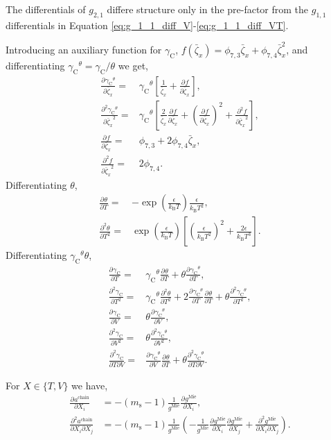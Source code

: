 \documentclass[english]{../thermomemo/thermomemo}
\newcommand*{\pd}[3][]{\frac{\partial^{#1}#2}{\partial{#3}^{#1}}}%
\newcommand*{\pdc}[3]{\frac{\partial^{2}#1}{\partial{#2}\partial{#3}}}%
\newcommand*{\lb}{\left(}
\newcommand*{\rb}{\right)}
\newcommand{\mie}{\text{Mie}\xspace}
\newcommand{\chain}{\ensuremath{\text{chain}}\xspace}
\newcommand{\seg}{\ensuremath{\text{s}}\xspace}
\newcommand{\kB}{\ensuremath{k_{\text{B}}}\xspace}
\newcommand{\gamc}{\ensuremath{\gamma_{\text{C}}}\xspace}
\newcommand{\zb}{\bar{\zeta}}
\begin{document}
The differentials of $g_{2,1}$ differe structure only in the
pre-factor from the $g_{1,1}$ differentials in Equation
\ref{eq:g_1_1_diff_V}-\ref{eq:g_1_1_diff_VT}.

Introducing an auxiliary function for $\gamc$,
$f\lb\zb_x \rb = \phi_{7,3}\zb_x + \phi_{7,4} \zb_x^2$, and differentiating $\gamc^\theta = \gamc/\theta$
we get,
\begin{align}
  \label{eq:gamma_theta_C_diff}
  \pd{\gamc^\theta}{\zb_x} =& \gamc^\theta \left[\frac{1}{\zb_x} + \pd{f}{\zb_x} \right], \\
  \pd[2]{\gamc^\theta}{\zb_x} =& \gamc^\theta \left[\frac{2}{\zb_x}\pd{f}{\zb_x} + \lb\pd{f}{\zb_x} \rb^2 + \pd[2]{f}{\zb_x}\right],\\
    \pd{f}{\zb_x} =& \phi_{7,3} + 2\phi_{7,4} \zb_x, \\
  \pd[2]{f}{\zb_x} =& 2\phi_{7,4}.
\end{align}
Differentiating $\theta$,
\begin{align}
  \label{eq:theta_diff}
  \pd{\theta}{T} =& - \exp\lb \frac{ \epsilon}{\kB T} \rb \frac{\epsilon}{\kB T^2}, \\
  \pd[2]{\theta}{T} =& \exp\lb \frac{ \epsilon}{\kB T} \rb \left[\lb\frac{\epsilon}{\kB T^2}\rb^2 + \frac{2\epsilon}{\kB T^3} \right].
\end{align}
Differentiating $\gamc^\theta \theta$,
\begin{align}
  \label{eq:gamma_C_diff_T}
  \pd{\gamc}{T} =& \gamc^\theta \pd{\theta}{T} + \theta\pd{\gamc^\theta }{T} , \\
  \pd[2]{\gamc}{T} =& \gamc^\theta \pd[2]{\theta}{T} + 2\pd{\gamc^\theta }{T}\pd{\theta}{T} + \theta \pd[2]{\gamc^\theta }{T},\\
  \pd{\gamc}{V} =& \theta \pd{\gamc^\theta}{V}, \\
  \pd[2]{\gamc}{V} =& \theta \pd[2]{\gamc^\theta}{V}, \\
  \pdc{\gamc}{T}{V} =& \pd{\gamc^\theta}{V}\pd{\theta}{T} + \theta\pdc{\gamc^\theta }{T}{V}.
\end{align}

For $X \in \{T, V \}$ we have,
\begin{align}
  \label{eq:a_chain_diff}
  \pd{a^\chain}{X_i} &= -\lb m_\seg -1\rb \frac{1}{g^\mie}\pd{g^\mie}{X_i},\\
  \pdc{a^\chain}{X_i}{X_j} &= -\lb m_\seg -1\rb \frac{1}{g^\mie} \lb -\frac{1}{g^\mie}\pd{g^\mie}{X_i}\pd{g^\mie}{X_j} + \pdc{g^\mie}{X_i}{X_j} \rb.\\
\end{align}
\end{document}
